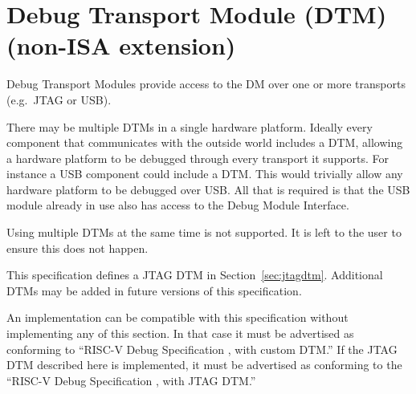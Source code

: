 \chapter{Debug Transport Module (DTM) (non-ISA extension)} \label{dtm}

Debug Transport Modules provide access to the DM over one or more transports
(e.g.\ JTAG or USB).

There may be multiple DTMs in a single hardware platform. Ideally every component that
communicates with the outside world includes a DTM, allowing a hardware platform to be
debugged through every transport it supports.  For instance a USB component
could include a DTM. This would trivially allow any hardware platform to be debugged
over USB. All that is required is that the USB module already in use also has
access to the Debug Module Interface.

Using multiple DTMs at the same time is not supported. It is left to the user
to ensure this does not happen.

This specification defines a JTAG DTM in Section~\ref{sec:jtagdtm}. Additional DTMs
may be added in future versions of this specification.

An implementation can be compatible with this specification without implementing
any of this section. In that case it must be advertised as conforming to
``RISC-V Debug Specification \versionnum, with custom DTM.'' If the JTAG DTM
described here is implemented, it must be advertised as conforming to the
``RISC-V Debug Specification \versionnum, with JTAG DTM.''


